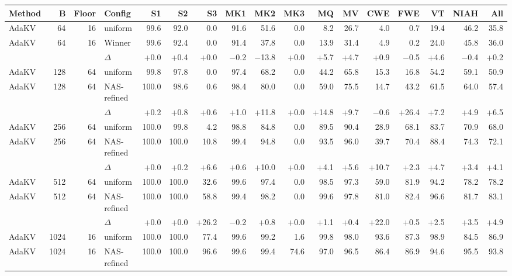 \begin{table}[t]
  \centering
  \scriptsize
  \setlength{\tabcolsep}{2.5pt}
  \begin{tabular}{@{}l r r l r r r r r r r r r r r r r @{}}
    \toprule
    Method & B & Floor & Config & S1 & S2 & S3 & MK1 & MK2 & MK3 & MQ & MV & CWE & FWE & VT & NIAH & All \\
    \midrule
    AdaKV & 64 & 16 & uniform & 99.6 & 92.0 & 0.0 & 91.6 & 51.6 & 0.0 & 8.2 & 26.7 & 4.0 & 0.7 & 19.4 & 46.2 & 35.8 \\
    AdaKV & 64 & 16 & Winner & 99.6 & 92.4 & 0.0 & 91.4 & 37.8 & 0.0 & 13.9 & 31.4 & 4.9 & 0.2 & 24.0 & 45.8 & 36.0 \\
     &  &  & $\Delta$ & +0.0 & +0.4 & +0.0 & $-$0.2 & $-$13.8 & +0.0 & +5.7 & +4.7 & +0.9 & $-$0.5 & +4.6 & $-$0.4 & +0.2 \\
    \midrule
    AdaKV & 128 & 64 & uniform & 99.8 & 97.8 & 0.0 & 97.4 & 68.2 & 0.0 & 44.2 & 65.8 & 15.3 & 16.8 & 54.2 & 59.1 & 50.9 \\
    AdaKV & 128 & 64 & NAS-refined & 100.0 & 98.6 & 0.6 & 98.4 & 80.0 & 0.0 & 59.0 & 75.5 & 14.7 & 43.2 & 61.5 & 64.0 & 57.4 \\
     &  &  & $\Delta$ & +0.2 & +0.8 & +0.6 & +1.0 & +11.8 & +0.0 & +14.8 & +9.7 & $-$0.6 & +26.4 & +7.2 & +4.9 & +6.5 \\
    \midrule
    AdaKV & 256 & 64 & uniform & 100.0 & 99.8 & 4.2 & 98.8 & 84.8 & 0.0 & 89.5 & 90.4 & 28.9 & 68.1 & 83.7 & 70.9 & 68.0 \\
    AdaKV & 256 & 64 & NAS-refined & 100.0 & 100.0 & 10.8 & 99.4 & 94.8 & 0.0 & 93.5 & 96.0 & 39.7 & 70.4 & 88.4 & 74.3 & 72.1 \\
     &  &  & $\Delta$ & +0.0 & +0.2 & +6.6 & +0.6 & +10.0 & +0.0 & +4.1 & +5.6 & +10.7 & +2.3 & +4.7 & +3.4 & +4.1 \\
    \midrule
    AdaKV & 512 & 64 & uniform & 100.0 & 100.0 & 32.6 & 99.6 & 97.4 & 0.0 & 98.5 & 97.3 & 59.0 & 81.9 & 94.2 & 78.2 & 78.2 \\
    AdaKV & 512 & 64 & NAS-refined & 100.0 & 100.0 & 58.8 & 99.4 & 98.2 & 0.0 & 99.6 & 97.8 & 81.0 & 82.4 & 96.6 & 81.7 & 83.1 \\
     &  &  & $\Delta$ & +0.0 & +0.0 & +26.2 & $-$0.2 & +0.8 & +0.0 & +1.1 & +0.4 & +22.0 & +0.5 & +2.5 & +3.5 & +4.9 \\
    \midrule
    AdaKV & 1024 & 16 & uniform & 100.0 & 100.0 & 77.4 & 99.6 & 99.2 & 1.6 & 99.8 & 98.0 & 93.6 & 87.3 & 98.9 & 84.5 & 86.9 \\
    AdaKV & 1024 & 16 & NAS-refined & 100.0 & 100.0 & 96.6 & 99.6 & 99.4 & 74.6 & 97.0 & 96.5 & 86.4 & 86.9 & 94.6 & 95.5 & 93.8 \\

\end{tabular}
\end{table}
